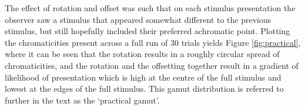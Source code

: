 The effect of rotation and offset was such that on each stimulus presentation the observer saw a stimulus that appeared somewhat different to the previous stimulus, but still hopefully included their preferred achromatic point. %
Plotting the chromaticities present across a full run of 30 trials yields Figure \ref{fig:practical}, where it can be seen that the rotation results in a roughly circular spread of chromaticities, and the rotation and the offsetting together result in a gradient of likelihood of presentation which is high at the centre of the full stimulus and lowest at the edges of the full stimulus. This gamut distribution is referred to further in the text as the `practical gamut'.





